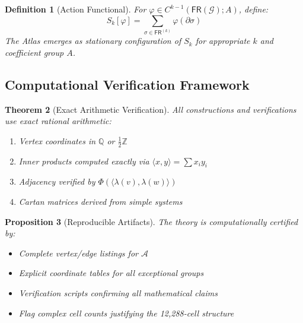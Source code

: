 \documentclass[12pt]{article}
\newtheorem{theorem}{Theorem}
\newtheorem{definition}[theorem]{Definition}
\newtheorem{proposition}[theorem]{Proposition}
\newcommand{\ZZ}{\mathbb{Z}}
\newcommand{\QQ}{\mathbb{Q}}
\newcommand{\A}{\mathcal{A}}
\newcommand{\G}{\mathcal{G}}
\newcommand{\PhiAdj}{\Phi}
\begin{document}
\begin{definition}[Action Functional]
For $\varphi \in C^{k-1}(\mathsf{FR}(\G); A)$, define:
\[
S_k[\varphi] = \sum_{\sigma \in \mathsf{FR}^{(k)}} \varphi(\partial \sigma)
\]
The Atlas emerges as stationary configuration of $S_k$ for appropriate $k$ and coefficient group $A$.
\end{definition}

\subsection{Computational Verification Framework}

\begin{theorem}[Exact Arithmetic Verification]
All constructions and verifications use exact rational arithmetic:
\begin{enumerate}
\item Vertex coordinates in $\QQ$ or $\frac12\ZZ$
\item Inner products computed exactly via $\langle x,y \rangle = \sum x_i y_i$
\item Adjacency verified by $\PhiAdj(\langle \lambda(v), \lambda(w) \rangle)$
\item Cartan matrices derived from simple systems
\end{enumerate}
\end{theorem}

\begin{proposition}[Reproducible Artifacts]
The theory is computationally certified by:
\begin{itemize}
\item Complete vertex/edge listings for $\A$
\item Explicit coordinate tables for all exceptional groups
\item Verification scripts confirming all mathematical claims
\item Flag complex cell counts justifying the 12,288-cell structure
\end{itemize}
\end{proposition}
\end{document}
